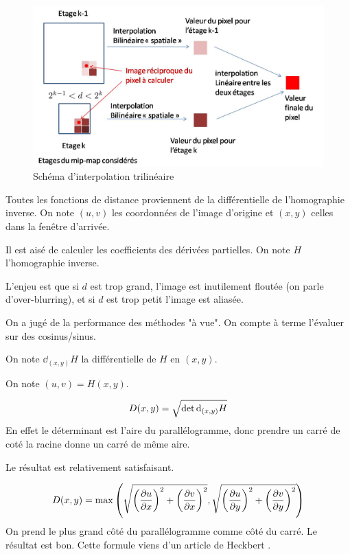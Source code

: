 \begin{figure}[h!]
\centering
\caption{Schéma d'interpolation trilinéaire}
\includegraphics[scale=0.5]{intertrilineaire.jpg}
\end{figure}


Toutes les fonctions de distance proviennent de la différentielle de l'homographie inverse.
On note $(u,v)$ les coordonnées de l'image d'origine et $(x,y)$ celles dans la fenêtre d'arrivée.

Il est aisé de calculer les coefficients des dérivées partielles. On note $H$ l'homographie inverse.


L'enjeu est que si $d$ est trop grand, l'image est inutilement floutée (on parle d'over-blurring), et si $d$ est trop petit l'image est aliasée.

On a jugé de la performance des méthodes "à vue". On compte à terme l'évaluer sur des cosinus/sinus.

On note $\dd_{(x,y)} H$ la différentielle de $H$ en $(x,y)$.

On note $(u,v)=H(x,y)$.

$$D(x,y) = \sqrt{\det \textrm{d}_{(x,y)} H}$$
En effet le déterminant est l'aire du parallélogramme, donc prendre un carré de coté la racine donne un carré de même aire.

Le résultat est relativement satisfaisant.


$$ D(x,y) = \max \left(\sqrt{\left(\frac{\partial u}{\partial x}\right)^2 + \left(\frac{\partial v}{\partial x}\right)^2},\sqrt{\left(\frac{\partial u}{\partial y}\right)^2 + \left(\frac{\partial v}{\partial y}\right)^2}\right)$$
On prend le plus grand côté du parallélogramme comme côté du carré. Le résultat est bon. Cette formule viens d'un article de Heckbert \cite{heckbert1983texture}.


